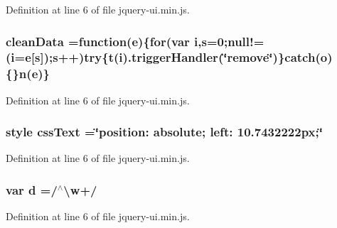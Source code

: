 {{Definition at line 6 of file jquery-\/ui.\+min.\+js.

\subsubsection[{\texorpdfstring{clean\+Data}{cleanData}}]{ clean\+Data =function({\bf e})\{{\bf for}(var {\bf i},{\bf s}=0;null!=({\bf i}={\bf e}\mbox{[}{\bf s}\mbox{]});{\bf s}++)try\{{\bf t}({\bf i}).trigger\+Handler(\char`\"{}remove\char`\"{})\}catch({\bf o})\{\}{\bf n}({\bf e})\}}\hypertarget{jquery-ui_8min_8js_a304b1437a008590db86eff55d7998558}{}\label{jquery-ui_8min_8js_a304b1437a008590db86eff55d7998558}


Definition at line 6 of file jquery-\/ui.\+min.\+js.

\subsubsection[{\texorpdfstring{css\+Text}{cssText}}]{ style css\+Text =\char`\"{}position\+: absolute; left\+: 10.\+7432222px;\char`\"{}}\hypertarget{jquery-ui_8min_8js_a1aa5823ddc65573329cac2fa14dc4e5d}{}\label{jquery-ui_8min_8js_a1aa5823ddc65573329cac2fa14dc4e5d}


Definition at line 6 of file jquery-\/ui.\+min.\+js.

\subsubsection[{\texorpdfstring{d}{d}}]{\setlength{\rightskip}{0pt plus 5cm}var d =/$^\wedge$\textbackslash{}{\bf w}+/}\hypertarget{jquery-ui_8min_8js_aeb337d295abaddb5ec3cb34cc2e2bbc9}{}\label{jquery-ui_8min_8js_aeb337d295abaddb5ec3cb34cc2e2bbc9}


Definition at line 6 of file jquery-\/ui.\+min.\+js.

}}
